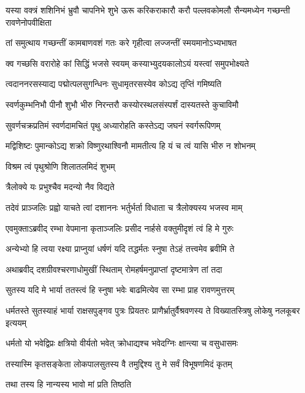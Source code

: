 \threelineshloka
{यस्या वक्त्रं शशिनिभं भ्रुवौ चापनिभे शुभे}
{ऊरू करिकराकारौ करौ पल्लवकोमलौ}
{सैन्यमध्येन गच्छन्ती रावणेनोपवीक्षिता} %

\twolineshloka
{तां समुत्थाय गच्छन्तीं कामबाणवशं गतः}
{करे गृहीत्वा लज्जन्तीं स्मयमानोऽभ्यभाषत} %

\twolineshloka
{क्व गच्छसि वरारोहे कां सिद्धिं भजसे स्वयम्}
{कस्याभ्युदयकालोऽयं यस्त्वां समुपभोक्ष्यते} %

\twolineshloka
{त्वदाननरसस्याद्य पद्मोत्पलसुगन्धिनः}
{सुधामृतरसस्येव कोऽद्य तृप्तिं गमिष्यति} %

\twolineshloka
{स्वर्णकुम्भनिभौ पीनौ शुभौ भीरु निरन्तरौ}
{कस्योरस्थलसंस्पर्शं दास्यतस्ते कुचाविमौ} %

\twolineshloka
{सुवर्णचक्रप्रतिमं स्वर्णदामचितं पृथु}
{अध्यारोहति कस्तेऽद्य जघनं स्वर्गरूपिणम्} %

\twolineshloka
{मद्विशिष्टः पुमान्कोऽद्य शक्रो विष्णुरथाश्विनौ}
{मामतीत्य हि यं च त्वं यासि भीरु न शोभनम्} %

\onelineshloka
{विश्रम त्वं पृथुश्रोणि शिलातलमिदं शुभम्} %

\onelineshloka
{त्रैलोक्ये यः प्रभुश्चैव मदन्यो नैव विद्यते} %

\twolineshloka
{तदेवं प्राञ्जलिः प्रह्वो याचते त्वां दशाननः}
{भर्तुर्भर्ता विधाता च त्रैलोक्यस्य भजस्व माम्} %

\twolineshloka
{एवमुक्ताऽब्रवीद् रम्भा वेपमाना कृताञ्जलिः}
{प्रसीद नार्हसे वक्तुमीदृशं त्वं हि मे गुरुः} %

\twolineshloka
{अन्येभ्यो हि त्वया रक्ष्या प्राप्नुयां धर्षणं यदि}
{तद्धर्मतः स्नुषा तेऽहं तत्त्वमेव ब्रवीमि ते} %

\twolineshloka
{अथाब्रवीद् दशग्रीवश्चरणाधोमुखीं स्थिताम्}
{रोमहर्षमनुप्राप्तां दृष्टमात्रेण तां तदा} %

\twolineshloka
{सुतस्य यदि मे भार्या ततस्त्वं हि स्नुषा भवेः}
{बाढमित्येव सा रम्भा प्राह रावणमुत्तरम्} %

\threelineshloka
{धर्मतस्ते सुतस्याहं भार्या राक्षसपुङ्गव}
{पुत्रः प्रियतरः प्राणैर्भ्रातुर्वैश्रवणस्य ते}
{विख्यातस्त्रिषु लोकेषु नलकूबर इत्ययम्} %

\twolineshloka
{धर्मतो यो भवेद्विप्रः क्षत्रियो वीर्यतो भवेत्}
{क्रोधाद्यश्च भवेदग्निः क्षान्त्या च वसुधासमः} %

\twolineshloka
{तस्यास्मि कृतसङ्केता लोकपालसुतस्य वै}
{तमुद्दिश्य तु मे सर्वं विभूषणमिदं कृतम्} %

\onelineshloka
{तथा तस्य हि नान्यस्य भावो मां प्रति तिष्ठति} %

